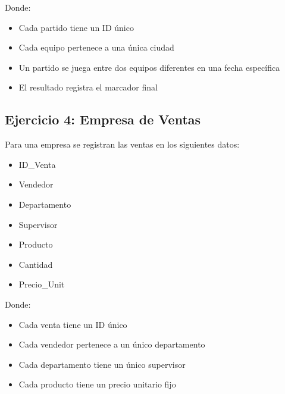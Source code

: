\documentclass[12pt]{article}
\begin{document}
\vspace{1em}

Donde:
\begin{itemize}
    \item Cada partido tiene un ID único
    \item Cada equipo pertenece a una única ciudad
    \item Un partido se juega entre dos equipos diferentes en una fecha específica
    \item El resultado registra el marcador final
\end{itemize}

\subsection{Ejercicio 4: Empresa de Ventas}
Para una empresa se registran las ventas en los siguientes datos:

\vspace{0.5em}

\begin{minipage}[t]{0.48\textwidth}
\begin{itemize}
    \item ID\_Venta
    \item Vendedor
    \item Departamento
    \item Supervisor
\end{itemize}
\end{minipage}
\begin{minipage}[t]{0.48\textwidth}
\begin{itemize}
    \item Producto
    \item Cantidad
    \item Precio\_Unit
\end{itemize}
\end{minipage}

\vspace{1em}

Donde:
\begin{itemize}
    \item Cada venta tiene un ID único
    \item Cada vendedor pertenece a un único departamento
    \item Cada departamento tiene un único supervisor
    \item Cada producto tiene un precio unitario fijo
\end{itemize}
\end{document}
